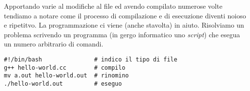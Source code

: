 \documentclass[class=article, crop=false, 12pt]{standalone}
\begin{document}
Apportando varie al modifiche al file ed avendo compilato numerose volte tendiamo a notare come il processo di compilazione e di esecuzione diventi noioso e ripetitvo.
La programmazione ci viene (anche stavolta) in aiuto.
Risolviamo un problema scrivendo un programma (in gergo informatico uno \emph{script}) che esegua un numero arbitrario di comandi.

\begin{verbatim}
#!/bin/bash               # indico il tipo di file
g++ hello-world.cc        # compilo
mv a.out hello-world.out  # rinomino
./hello-world.out         # eseguo
\end{verbatim}
\end{document}
